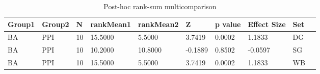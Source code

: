 \begin{table}
\centering
\begin{tabular}[0.2em]{@{}llllllllll@{}}\toprule
Group1 & Group2 & N & rankMean1 & rankMean2 & Z & p value & Effect Size & Set\\\toprule[0.2em]
BA & PPI & 10 & 15.5000 & 5.5000 & 3.7419 & 0.0002 & 1.1833 & DG \\\midrule
BA & PPI & 10 & 10.2000 & 10.8000 & -0.1889 & 0.8502 & -0.0597 & SG \\\midrule
BA & PPI & 10 & 15.5000 & 5.5000 & 3.7419 & 0.0002 & 1.1833 & WB \\\bottomrule[0.2em]
\end{tabular}
\caption{Post-hoc rank-sum multicomparison\label{tabel:null}}
\end{table}
